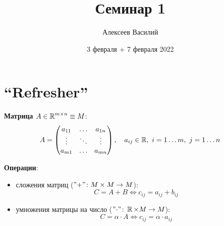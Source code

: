 \documentclass[a4paper,12pt]{article}
\author{Алексеев Василий}
\title{Семинар 1}
\date{3 февраля + 7 февраля 2022}
\begin{document}
  \maketitle
  
  \tableofcontents

  \thispagestyle{empty}
  
  \newpage
  

  \section{``Refresher''}
    \noindent
    
    \textbf{Матрица} $A \in \operatorname{\mathbb R}^{m \times n} \equiv M$:
    \[
      A = \begin{pmatrix}
        a_{11} & \ldots & a_{1n}\\
        \vdots & \ddots & \vdots\\
        a_{m1} & \ldots & a_{mn}
      \end{pmatrix}, \quad a_{ij} \in \operatorname{\mathbb R},\ i = 1 \ldots m,\ j = 1 \ldots n
    \]
    
    \textbf{Операции}:
    \begin{itemize}
      \item сложения матриц ($"{+}"\colon M \hm\times M \hm\to M$):
      \[
        C = A + B \Leftrightarrow c_{ij} = a_{ij} + b_{ij}
      \]
      
      \item умножения матрицы на число ($"{\cdot}"\colon \RR \hm\times M \hm\to M$):
      \[
        C = \alpha \cdot A \Leftrightarrow c_{ij} = \alpha \cdot a_{ij}
      \]
    \end{itemize}
    
\end{document}
